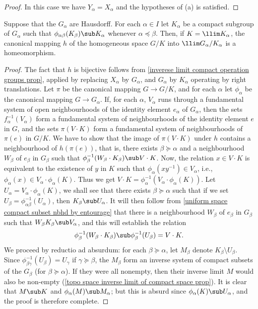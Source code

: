 \begin{proof}
In this case we have $Y_\alpha=X_\alpha$ and the hypotheses of (a) is satisfied.
\end{proof}
\begin{corollary}
Suppose that the $G_\alpha$ are Hausdorff. For each $\alpha\in I$ let $K_\alpha$ be a compact subgroup of $G_\alpha$ such that $\phi_{\alpha\beta}(K_\beta)\sub K_\alpha$ whenever $\alpha\preceq\beta$. Then, if $K=\llim K_\alpha$, the canonical mapping $h$ of the homogeneous space $G/K$ into $\llim G_\alpha/K_\alpha$ is a homeomorphism.
\end{corollary}
\begin{proof}
The fact that $h$ is bijective follows from \cref{inverese limit compact operation groups prop}, applied by replacing $X_\alpha$ by $G_\alpha$, and $G_\alpha$ by $K_\alpha$ operating by right translations. Let $\pi$ be the canonical mapping $G\to G/K$, and for each $\alpha$ let $\phi_\alpha$ be the canonical mapping $G\to G_\alpha$. If, for each $\alpha$, $V_\alpha$ runs through a fundamental system of open neighbourhoods of the identity element $e_\alpha$ of $G_\alpha$, then the sets $f_\alpha^{-1}(V_\alpha)$ form a fundamental system of neighbourhoods of the identity element $e$ in $G$, and the sets $\pi(V\cdot K)$ form a fundamental system of neighbourhoods of $\pi(e)$ in $G/K$. We have to show that the image of $\pi(V\cdot K)$ under $h$ contains a neighbourhood of $h(\pi(e))$, that is, there exists $\beta\succeq\alpha$ and a neighbourhood $W_\beta$ of $e_\beta$ in $G_\beta$ such that $\phi_\beta^{-1}(W_\beta\cdot K_\beta)\sub V\cdot K$. Now, the relation $x\in V\cdot K$ is equivalent to the existence of $y$ in $K$ such that $\phi_\alpha(xy^{-1})\in V_\alpha$, i.e., $\phi_\alpha(x)\in V_\alpha\cdot\phi_\alpha(K)$. Thus we get $V\cdot K=\phi_\alpha^{-1}(V_\alpha\cdot \phi_\alpha(K))$. Let $U_\alpha=V_\alpha\cdot\phi_\alpha(K)$, we shall see that there exists $\beta\succeq\alpha$ such that if we set $U_\beta=\phi_{\alpha\beta}^{-1}(U_\alpha)$, then $K_\beta\sub U_\alpha$. It will then follow from \cref{uniform space compact subset nbhd by entourage} that there is a neighbourhood $W_\beta$ of $e_\beta$ in $G_\beta$ such that $W_\beta K_\beta\sub V_\alpha$, and this will establish the relation
\[\phi_\beta^{-1}(W_\beta\cdot K_\beta)\sub\phi_\beta^{-1}(U_\beta)=V\cdot K.\]
We proceed by reductio ad absurdum: for each $\beta\succeq\alpha$, let $M_\beta$ denote $K_\beta\setminus U_\beta$. Since $\phi^{-1}_{\beta\gamma}(U_\beta)=U_\gamma$ if $\gamma\succeq\beta$, the $M_\beta$ form an inverse system of compact subsets of the $G_\beta$ (for $\beta\succeq\alpha$). If they were all nonempty, then their inverse limit $M$ would also be non-empty (\cref{topo space inverse limit of compact space prop}). It is clear that $M\sub K$ and $\phi_\alpha(M)\sub M_\alpha$; but this is absurd since $\phi_\alpha(K)\sub U_\alpha$, and the proof is therefore complete.
\end{proof}
